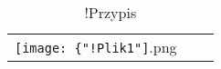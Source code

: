 \begin{table}[h]
\centering
\begin{tabularx}{0.43\textwidth}{@{\hspace{1.7 mm}}Xcc@{\hspace{1.7 mm}}}
\texttt{[image: \{"!Plik1"]}.png}  \\
\end{tabularx}
\caption{!Przypis}
\end{table}



